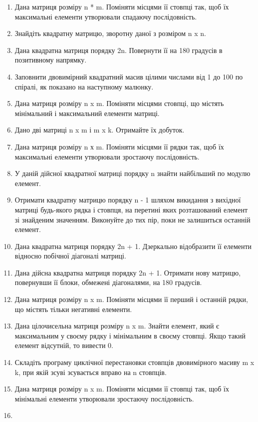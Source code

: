\documentclass[]{article}
\begin{document}
\begin{enumerate}
\def\labelenumi{\arabic{enumi})}
\item
  Дана матриця розміру n * m. Поміняти місцями її стовпці так, щоб їх
  максимальні елементи утворювали спадаючу послідовність.
\item
  Знайдіть квадратну матрицю, зворотну даної з розміром n x n.
\item
  Дана квадратна матриця порядку 2n. Повернути її на 180 градусів в
  позитивному напрямку.
\item
  Заповнити двовимірний квадратний масив цілими числами від 1 до 100 по
  спіралі, як показано на наступному малюнку.
\item
  Дана матриця розміру n x m. Поміняти місцями стовпці, що містять
  мінімальний і максимальний елементи матриці.
\item
  Дано дві матриці n x m і m x k. Отримайте їх добуток.
\item
  Дана матриця розміру n х m. Поміняти місцями її рядки так, щоб їх
  максимальні елементи утворювали зростаючу послідовність.
\item
  У даній дійсної квадратної матриці порядку n знайти найбільший по
  модулю елемент.
\item
  Отримати квадратну матрицю порядку n - 1 шляхом викидання з вихідної
  матриці будь-якого рядка і стовпця, на перетині яких розташований
  елемент зі знайденим значенням. Виконуйте до тих пір, поки не
  залишиться останній елемент.
\item
  Дана квадратна матриця порядку 2n + 1. Дзеркально відобразити її
  елементи відносно побічної діагоналі матриці.
\item
  Дана дійсна квадратна матриця порядку 2n + 1. Отримати нову матрицю,
  повернувши її блоки, обмежені діагоналями, на 180 градусів.
\item
  Дана матриця розміру n x m. Поміняти місцями її перший і останній
  рядки, що містять тільки негативні елементи.
\item
  Дана цілочисельна матриця розміру n x m. Знайти елемент, який є
  максимальним у своєму рядку і мінімальним в своєму стовпці. Якщо такий
  елемент відсутній, то вивести 0.
\item
  Складіть програму циклічної перестановки стовпців двовимірного масиву
  m x k, при якій зсуві зсувається вправо на n стовпців.
\item
  Дана матриця розміру n x m. Поміняти місцями її стовпці так, щоб їх
  мінімальні елементи утворювали зростаючу послідовність.
\item

\end{enumerate}
\end{document}
